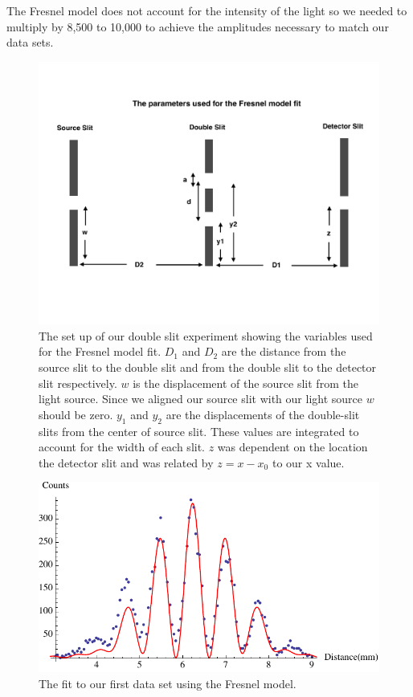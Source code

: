 \documentclass[prb,preprint]{revtex4-1}
\begin{document}
The Fresnel model does not account for the intensity of the light so we needed to multiply by 8,500 to 10,000 to achieve the amplitudes necessary to match our data sets.

\begin{figure}[h!]
\centering
\includegraphics[width=6in]{fresnelsetup.pdf}
\caption{The set up of our double slit experiment showing the variables used for the Fresnel model fit. $D_1$ and $D_2$ are the distance from the source slit to the double slit and from the double slit to the detector slit respectively. $w$ is the displacement of the source slit from the light source. Since we aligned our source slit with our light source $w$ should be zero. $y_1$ and $y_2$ are the displacements of the double-slit slits from the center of source slit. These values are integrated to account for the width of each slit. $z$ was dependent on the location the detector slit and was related by $z = x - x_0$ to our x value.}
\label{fresnelsetup}
\end{figure}

\begin{figure}[h!]
\centering
\includegraphics[width=6in]{doublefresnel1.pdf}
\caption{The fit to our first data set using the Fresnel model.}
\label{doublefresnel1}
\end{figure}
\end{document}
